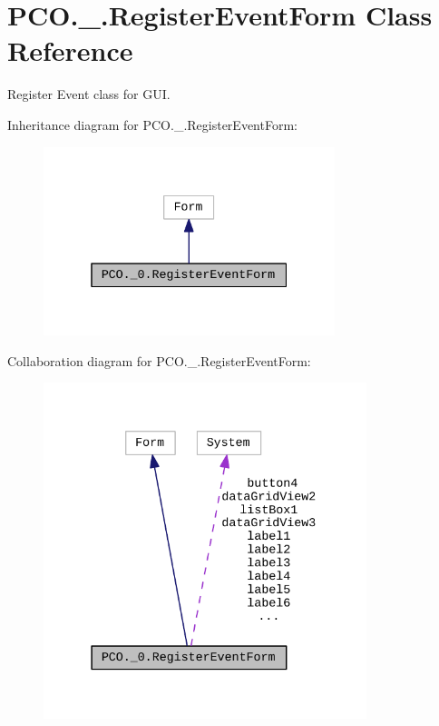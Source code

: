 \hypertarget{classPCO_1_1__0_1_1RegisterEventForm}{}\section{P\+C\+O.\+\_.\+Register\+Event\+Form Class Reference}
\label{classPCO_1_1__0_1_1RegisterEventForm}


Register Event class for G\+UI.  




Inheritance diagram for P\+C\+O.\+\_.\+Register\+Event\+Form\+:\nopagebreak
\begin{figure}[H]
\begin{center}
\leavevmode
\includegraphics[width=241pt]{classPCO_1_1__0_1_1RegisterEventForm__inherit__graph}
\end{center}
\end{figure}


Collaboration diagram for P\+C\+O.\+\_.\+Register\+Event\+Form\+:\nopagebreak
\begin{figure}[H]
\begin{center}
\leavevmode
\includegraphics[width=267pt]{classPCO_1_1__0_1_1RegisterEventForm__coll__graph}
\end{center}
\end{figure}
